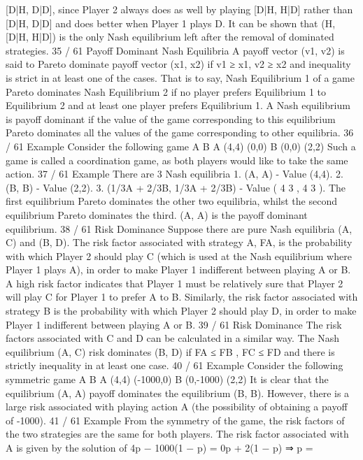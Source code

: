 [D|H, D|D], since Player 2 always does as well by playing
[D|H, H|D] rather than [D|H, D|D] and does better when Player 1
plays D.
It can be shown that (H, [D|H, H|D]) is the only Nash equilibrium
left after the removal of dominated strategies.
35 / 61
Payoff Dominant Nash Equilibria
A payoff vector (v1, v2) is said to Pareto dominate payoff vector
(x1, x2) if v1 ≥ x1, v2 ≥ x2 and inequality is strict in at least one of
the cases.
That is to say, Nash Equilibrium 1 of a game Pareto dominates
Nash Equilibrium 2 if no player prefers Equilibrium 1 to Equilibrium
2 and at least one player prefers Equilibrium 1.
A Nash equilibrium is payoff dominant if the value of the game
corresponding to this equilibrium Pareto dominates all the values
of the game corresponding to other equilibria.
36 / 61
Example
Consider the following game
A B
A (4,4) (0,0)
B (0,0) (2,2)
Such a game is called a coordination game, as both players would
like to take the same action.
37 / 61
Example
There are 3 Nash equilibria
1. (A, A) - Value (4,4).
2. (B, B) - Value (2,2).
3. (1/3A + 2/3B, 1/3A + 2/3B) - Value ( 4
3
,
4
3
).
The first equilibrium Pareto dominates the other two equilibria,
whilst the second equilibrium Pareto dominates the third.
(A, A) is the payoff dominant equilibrium.
38 / 61
Risk Dominance
Suppose there are pure Nash equilibria (A, C) and (B, D).
The risk factor associated with strategy A, FA, is the probability
with which Player 2 should play C (which is used at the Nash
equilibrium where Player 1 plays A), in order to make Player 1
indifferent between playing A or B.
A high risk factor indicates that Player 1 must be relatively sure
that Player 2 will play C for Player 1 to prefer A to B.
Similarly, the risk factor associated with strategy B is the
probability with which Player 2 should play D, in order to make
Player 1 indifferent between playing A or B.
39 / 61
Risk Dominance
The risk factors associated with C and D can be calculated in a
similar way.
The Nash equilibrium (A, C) risk dominates (B, D) if FA ≤ FB ,
FC ≤ FD and there is strictly inequality in at least one case.
40 / 61
Example
Consider the following symmetric game
A B
A (4,4) (-1000,0)
B (0,-1000) (2,2)
It is clear that the equilibrium (A, A) payoff dominates the
equilibrium (B, B). However, there is a large risk associated with
playing action A (the possibility of obtaining a payoff of -1000).
41 / 61
Example
From the symmetry of the game, the risk factors of the two
strategies are the same for both players.
The risk factor associated with A is given by the solution of
4p − 1000(1 − p) = 0p + 2(1 − p) ⇒ p =
